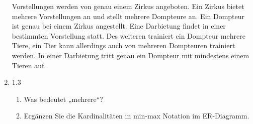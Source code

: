 \documentclass{lehramt-informatik-aufgabe}
\begin{document}
\begin{enumerate}
Vorstellungen werden von genau einem Zirkus angeboten. Ein Zirkus bietet
mehrere Vorstellungen an und stellt mehrere Dompteure an. Ein Dompteur
ist genau bei einem Zirkus angestellt. Eine Darbietung findet in einer
bestimmten Vorstellung statt. Des weiteren trainiert ein Dompteur
mehrere Tiere, ein Tier kann allerdings auch von mehreren Dompteuren
trainiert werden. In einer Darbietung tritt genau ein Dompteur mit
mindestens einem Tieren auf.

\item 1.3

\begin{enumerate}


\item Was bedeutet „mehrere“?


\item Ergänzen Sie die Kardinalitäten in min-max Notation im
ER-Diagramm.

\end{enumerate}

\end{enumerate}

\end{document}
